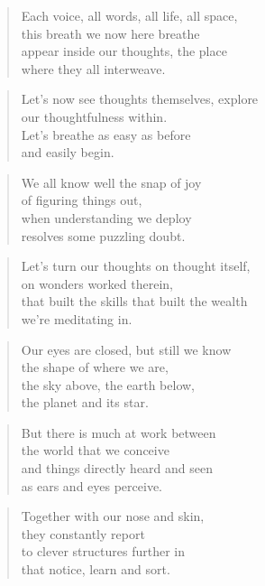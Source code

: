 \documentclass[14pt,a4paper]{article}
\begin{document}

\begin{verse}
Each voice, all words, all life, all space,\\
this breath we now here breathe\\
appear inside our thoughts, the place\\
where they all interweave.
\end{verse}

\begin{verse}
Let’s now see thoughts themselves, explore\\
our thoughtfulness within.\\
Let’s breathe as easy as before\\
and easily begin.
\end{verse}

\begin{verse}
We all know well the snap of joy\\
of figuring things out,\\
when understanding we deploy\\
resolves some puzzling doubt.
\end{verse}

\begin{verse}
Let’s turn our thoughts on thought itself,\\
on wonders worked therein,\\
that built the skills that built the wealth\\
we’re meditating in.
\end{verse}

\begin{verse}
Our eyes are closed, but still we know\\
the shape of where we are,\\
the sky above, the earth below,\\
the planet and its star.
\end{verse}

\begin{verse}
But there is much at work between\\
the world that we conceive\\
and things directly heard and seen\\
as ears and eyes perceive.
\end{verse}

\begin{verse}
Together with our nose and skin,\\
they constantly report\\
to clever structures further in\\
that notice, learn and sort.
\end{verse}
\end{document}
